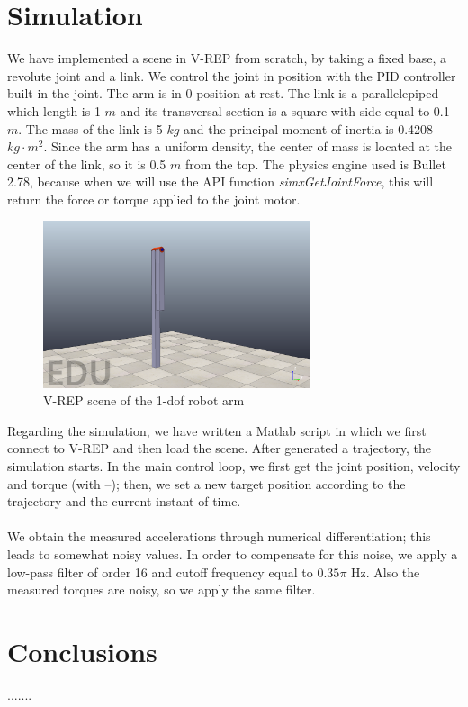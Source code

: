 \documentclass{article}
\begin{document}
\section{Simulation}
We have implemented a scene in V-REP from scratch, by taking a fixed base, a revolute joint and a link. We control the joint in position with the PID controller built in the joint. The arm is in 0 position at rest. The link is a parallelepiped which length is 1 $m$ and its transversal section is a square with side equal to 0.1 $m$. The mass of the link is 5 $kg$ and the principal moment of inertia is 0.4208 $kg\cdot m^2$. Since the arm has a uniform density, the center of mass is located at the center of the link, so it is 0.5 $m$ from the top. The physics engine used is Bullet 2.78, because when we will use the API function \textit{simxGetJointForce}, this will return the force or torque applied to the joint motor.
\begin{figure}[!htbp]
\centering
\includegraphics[width=0.7\textwidth]{images/1-dof/scene.png}
\caption{V-REP scene of the 1-dof robot arm}
\end{figure}
\FloatBarrier
Regarding the simulation, we have written a Matlab script in which we first connect to V-REP and then load the scene. After generated a trajectory, the simulation starts. In the main control loop, we first get the joint position, velocity and torque (with –); then, we set a new target position according to the trajectory and the current instant of time.
\\\\
We obtain the measured accelerations through numerical differentiation; this leads to somewhat noisy values. In order to compensate for this noise, we apply a low-pass filter of order 16 and cutoff frequency equal to $0.35\pi$ Hz. Also the measured torques are noisy, so we apply the same filter.

\section{Conclusions}
.......
\clearpage
\end{document}

